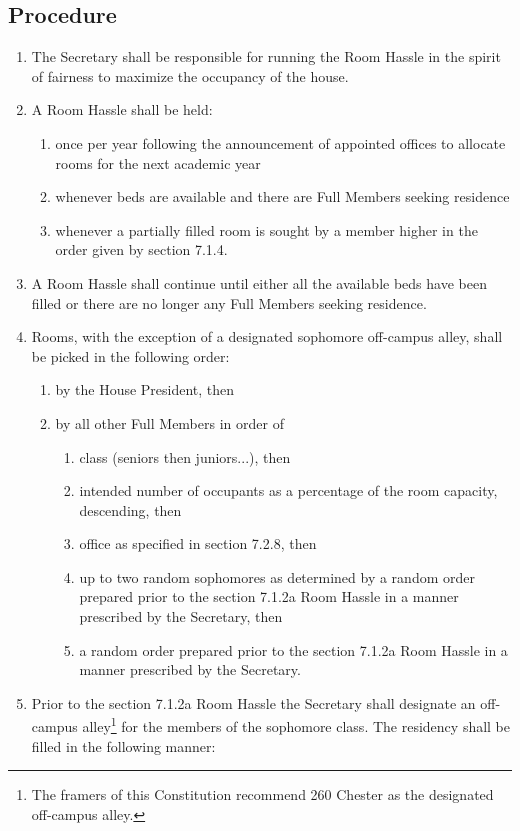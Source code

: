 \documentclass[10pt]{article} %
\begin{document}
\subsection{Procedure}
\begin{enumerate}
\item The Secretary shall be responsible for running the Room Hassle in the spirit of fairness to maximize the occupancy of the house.
\item A Room Hassle shall be held:
\begin{enumerate}
\item once per year following the announcement of appointed offices to allocate rooms for the next academic year
\item whenever beds are available and there are Full Members seeking residence
\item whenever a partially filled room is sought by a member higher in the order given by section 7.1.4.
\end{enumerate}
\item A Room Hassle shall continue until either all the available beds have been filled or there are no longer any Full Members seeking residence.
\item Rooms, with the exception of a designated sophomore off-campus alley, shall be picked in the following order:
\begin{enumerate}
\item by the House President, then
\item by all other Full Members in order of
\begin{enumerate}
\item class (seniors then juniors...), then
\item intended number of occupants as a percentage of the room capacity, descending, then
\item office as specified in section 7.2.8, then
\item up to two random sophomores as determined by a random order prepared prior to the section 7.1.2a Room Hassle in a manner prescribed by the Secretary, then
\item a random order prepared prior to the section 7.1.2a Room Hassle in a manner prescribed by
the Secretary.
\end{enumerate}
\end{enumerate}
\item Prior to the section 7.1.2a Room Hassle the Secretary shall designate an off-campus alley\footnote{The framers of this Constitution recommend 260 Chester as the designated off-campus alley.} for the members of the sophomore class. The residency shall be filled in the following manner:

\end{enumerate}
\end{document}
